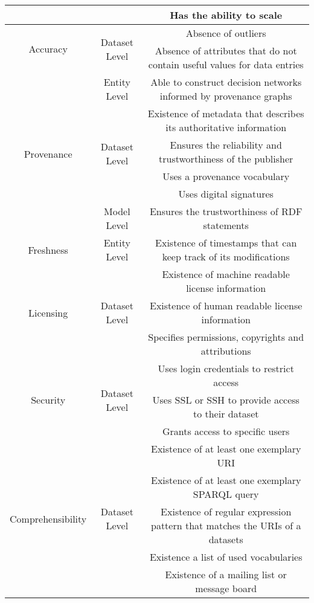 \documentclass[onecolumn, crcready]{iosart2c}
\begin{document}
\begin{landscape}
\begin{center}
\begin{longtable}[h]{|c|c|c|}
\cline{3-3} 
 &  & Has the ability to scale \tabularnewline
\hline 
\hline 
\multirow{2}{*}{Accuracy} & \multirow{2}{*}{Dataset Level} & Absence of outliers\tabularnewline
\cline{3-3} 
 &  & Absence of attributes that do not contain useful values for data entries\tabularnewline
\hline
\hline 
\multirow{6}{*}{Provenance} & \multirow{1}{*}{Entity Level} & Able to construct decision networks informed by provenance graphs\tabularnewline
\cline{2-3} 
 & \multirow{4}{*}{Dataset Level} & Existence of metadata that describes its authoritative information\tabularnewline
\cline{3-3} 
 &  & Ensures the reliability and trustworthiness of the publisher\tabularnewline
\cline{3-3} 
 &  & Uses a provenance vocabulary\tabularnewline
\cline{3-3} 
 &  & Uses digital signatures\tabularnewline
\cline{2-3} 
 & \multirow{1}{*}{Model Level} & Ensures the trustworthiness of RDF statements\tabularnewline
\hline 
\multirow{1}{*}{Freshness} & \multirow{1}{*}{Entity Level} & Existence of timestamps that can keep track of its modifications\tabularnewline
\hline 
\hline 
\multirow{3}{*}{Licensing} & \multirow{3}{*}{Dataset Level} & Existence of machine readable license information\tabularnewline
\cline{3-3} 
 &  & Existence of human readable license information\tabularnewline
\cline{3-3} 
 &  & Specifies permissions, copyrights and attributions\tabularnewline
\hline  
\hline 
\multirow{3}{*}{Security} & \multirow{3}{*}{Dataset Level} & Uses login credentials to restrict access\tabularnewline
\cline{3-3} 
 &  & Uses SSL or SSH to provide access to their dataset\tabularnewline
\cline{3-3} 
 &  & Grants access to specific users\tabularnewline
\hline 
\hline 
\multirow{5}{*}{Comprehensibility} & \multirow{5}{*}{Dataset Level} & Existence of at least one exemplary URI\tabularnewline
\cline{3-3} 
 &  & Existence of at least one exemplary SPARQL query\tabularnewline
\cline{3-3} 
 &  & Existence of regular expression pattern that matches the URIs of a datasets\tabularnewline
\cline{3-3} 
 &  & Existence a list of used vocabularies \tabularnewline
\cline{3-3} 
 &  & Existence of a mailing list or message board\tabularnewline
\end{longtable}
\end{center}
\end{landscape}



\end{document}
